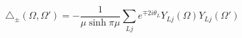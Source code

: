 \begin{equation}\label{triangle}
\triangle_{\pm}
(\Omega,\Omega')=
-\frac{1}{\mu\sinh\pi\mu}\sum_{Lj}
e^{\mp 2i\theta_L}Y_{Lj}(\Omega)Y_{Lj}(\Omega') \ 
\end{equation}

